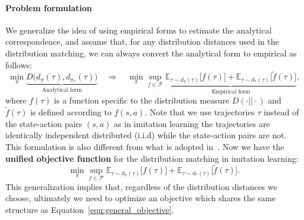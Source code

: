 
\paragraph{Problem formulation} We generalize the idea of using empirical forms to estimate the analytical correspondence, and assume that, for any distribution distances used in the distribution matching, we can always convert the analytical form to empirical as follows:
\begin{equation*}
\min_{\pi} \underbrace{D\big(d_{\pi}(\tau), d_{\pi_*}(\tau)\big)}_{\text{Analytical form}} \quad \Rightarrow \quad \min_{\pi} \sup_{f\in\mathcal{F}} \underbrace{ \mathbb{E}_{\tau\sim d_{\pi}(\tau)} \big[ f(\tau) \big] + \mathbb{E}_{\tau\sim d_*(\tau)} \big[\tilde{f}(\tau) \big]}_{\text{Empirical form}},
\end{equation*}
where $f(\tau)$ is a function specific to the distribution measure $D(\cdot||\cdot)$ and $\tilde{f}(\tau)$ is defined according to $f(s, a)$. 
Note that we use trajectories $\tau$ instead of the state-action pairs $(s, a)$ as in imitation learning the trajectories are identically independent distributed (i.i.d) while the state-action pairs are not. 
This formulation is also different from what is adopted in~\citep{ke2019imitation,ghasemipour2020divergence}. 
Now we have the \textbf{unified objective function} for the distribution matching in imitation learning:
\begin{equation}\label{equ:general_objective}
\min_{\pi} \sup_{f\in\mathcal{F}} \mathbb{E}_{\tau\sim d_{\pi}(\tau)} \big[ f(\tau) \big] + \mathbb{E}_{\tau\sim d_*(\tau)} \big[\tilde{f}(\tau) \big].
\end{equation}
This generalization implies that, regardless of the distribution distances we choose, ultimately we need to optimize an objective which shares the same structure as Equation~\ref{equ:general_objective}. 

